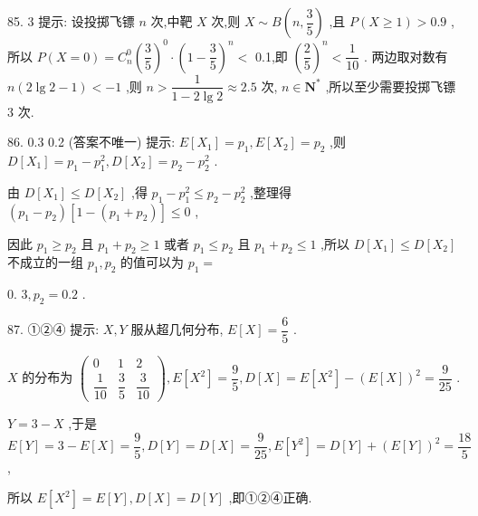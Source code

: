 85. 3 提示: 设投掷飞镖 $n$ 次,中靶 $X$ 次,则 $X \sim  B\left( {n,\dfrac{3}{5}}\right)$ ,且 $P\left( {X \geq  1}\right)  > {0.9}$ ,所以 $P\left( {X = 0}\right)  = {C}_{n}^{0}{\left( \dfrac{3}{5}\right) }^{0} \cdot  {\left( 1 - \dfrac{3}{5}\right) }^{n} <$ 0.1,即 ${\left( \dfrac{2}{5}\right) }^{n} < \dfrac{1}{10}$ . 两边取对数有 $n\left( {2\lg 2 - 1}\right)  <  - 1$ ,则 $n > \dfrac{1}{1 - 2\lg 2} \approx  {2.5}$ 次, $n \in  {\mathbf{N}}^{ * }$ ,所以至少需要投掷飞镖 3 次.

86. 0.3 0.2 (答案不唯一) 提示: $E\left\lbrack  {X}_{1}\right\rbrack   = {p}_{1},E\left\lbrack  {X}_{2}\right\rbrack   = {p}_{2}$ ,则 $D\left\lbrack  {X}_{1}\right\rbrack   = {p}_{1} - {p}_{1}^{2},D\left\lbrack  {X}_{2}\right\rbrack   = {p}_{2} - {p}_{2}^{2}$ .

由 $D\left\lbrack  {X}_{1}\right\rbrack   \leq  D\left\lbrack  {X}_{2}\right\rbrack$ ,得 ${p}_{1} - {p}_{1}^{2} \leq  {p}_{2} - {p}_{2}^{2}$ ,整理得 $\left( {{p}_{1} - {p}_{2}}\right) \left\lbrack  {1 - \left( {{p}_{1} + {p}_{2}}\right) }\right\rbrack   \leq  0$ ,

因此 ${p}_{1} \geq  {p}_{2}$ 且 ${p}_{1} + {p}_{2} \geq  1$ 或者 ${p}_{1} \leq  {p}_{2}$ 且 ${p}_{1} + {p}_{2} \leq  1$ ,所以 $D\left\lbrack  {X}_{1}\right\rbrack   \leq  D\left\lbrack  {X}_{2}\right\rbrack$ 不成立的一组 ${p}_{1},{p}_{2}$ 的值可以为 ${p}_{1} =$

0. $3,{p}_{2} = {0.2}$ .

87. ①②④ 提示: $X,Y$ 服从超几何分布, $E\left\lbrack  X\right\rbrack   = \dfrac{6}{5}$ .

$X$ 的分布为 $\left( \begin{matrix} 0 & 1 & 2 \\  \dfrac{1}{10} & \dfrac{3}{5} & \dfrac{3}{10} \end{matrix}\right) ,E\left\lbrack  {X}^{2}\right\rbrack   = \dfrac{9}{5},D\left\lbrack  X\right\rbrack   = E\left\lbrack  {X}^{2}\right\rbrack   - {\left( E\left\lbrack  X\right\rbrack  \right) }^{2} = \dfrac{9}{25}$ .

$Y = 3 - X$ ,于是 $E\left\lbrack  Y\right\rbrack   = 3 - E\left\lbrack  X\right\rbrack   = \dfrac{9}{5},D\left\lbrack  Y\right\rbrack   = D\left\lbrack  X\right\rbrack   = \dfrac{9}{25},E\left\lbrack  {Y}^{2}\right\rbrack   = D\left\lbrack  Y\right\rbrack   + {\left( E\left\lbrack  Y\right\rbrack  \right) }^{2} = \dfrac{18}{5}$ ,

所以 $E\left\lbrack  {X}^{2}\right\rbrack   = E\left\lbrack  Y\right\rbrack  ,D\left\lbrack  X\right\rbrack   = D\left\lbrack  Y\right\rbrack$ ,即①②④正确.

